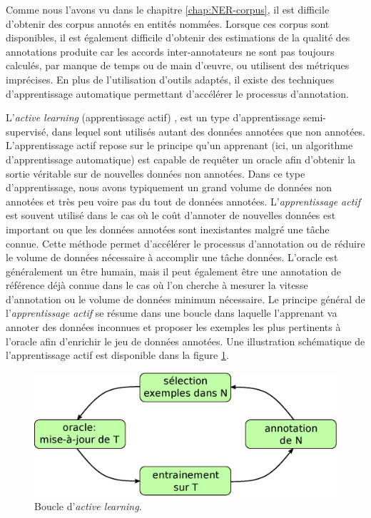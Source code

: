 \documentclass[PhD-Yoann-Dupont.tex]{subfiles}
\begin{document}
Comme nous l'avons vu dans le chapitre \ref{chap:NER-corpus}, il est difficile d'obtenir des corpus annotés en entités nommées. Lorsque ces corpus sont disponibles, il est également difficile d'obtenir des estimations de la qualité des annotations produite car les accords inter-annotateurs ne sont pas toujours calculés, par manque de temps ou de main d'\oe uvre, ou utilisent des métriques imprécises. En plus de l'utilisation d'outils adaptés, il existe des techniques d'apprentissage automatique permettant d'accélérer le processus d'annotation.

L'\textit{active learning} (apprentissage actif) \citep{angluin1987learning,kinzel1990improving,baum1991neural,mackay1992information}, est un type d'apprentissage semi-supervisé, dans lequel sont utilisés autant des données annotées que non annotées. L'apprentissage actif repose sur le principe qu'un apprenant (ici, un algorithme d'apprentissage automatique) est capable de requêter un oracle afin d'obtenir la sortie véritable sur de nouvelles données non annotées. Dans ce type d'apprentissage, nous avons typiquement un grand volume de données non annotées et très peu voire pas du tout de données annotées. L'\textit{apprentissage actif} est souvent utilisé dans le cas où le coût d'annoter de nouvelles données est important ou que les données annotées sont inexistantes malgré une tâche connue. Cette méthode permet d'accélérer le processus d'annotation ou de réduire le volume de données nécessaire à accomplir une tâche données. L'oracle est généralement un être humain, mais il peut également être une annotation de référence déjà connue dans le cas où l'on cherche à mesurer la vitesse d'annotation ou le volume de données minimum nécessaire. Le principe général de l'\textit{apprentissage actif} se résume dans une boucle dans laquelle l'apprenant va annoter des données inconnues et proposer les exemples les plus pertinents à l'oracle afin d'enrichir le jeu de données annotées. Une illustration schématique de l'apprentissage actif est disponible dans la figure \ref{fig:active-learning-loop}.

\begin{figure}[ht!]
\centering
\includegraphics[scale=0.65]{images/active-learning/active-learning-loop}
\caption{Boucle d'\textit{active learning}.}
\label{fig:active-learning-loop}
\end{figure}
\end{document}
